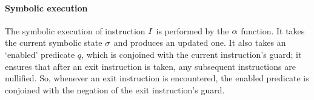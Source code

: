 {%

\paragraph{Symbolic execution}
The symbolic execution of instruction $I$ is performed by the $\alpha$
function. It takes the current symbolic state $\sigma$ and produces an
updated one. It also takes an `enabled' predicate $q$, which is conjoined with
the current instruction's guard; it ensures that after an exit instruction is
taken, any subsequent instructions are nullified. So, whenever an exit
instruction is encountered, the enabled predicate is conjoined with the negation
of the exit instruction's guard.

}
